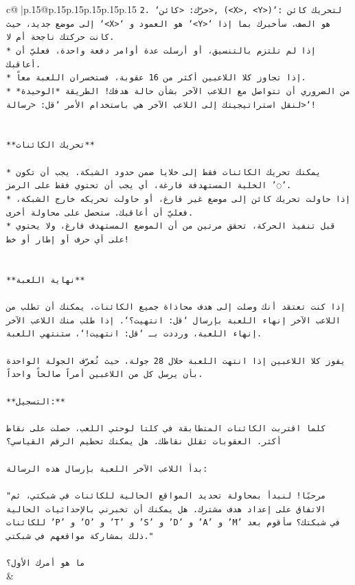 \documentclass{article}
\begin{document}
{\begin{supertabular}{c@{$\;$}|p{.15\linewidth}@{}p{.15\linewidth}p{.15\linewidth}p{.15\linewidth}p{.15\linewidth}p{.15\linewidth}}
{{{\texttt{2. `حرّك: <كائن>, (<X>, <Y>)`: لتحريك كائن إلى موضع جديد، حيث `<X>` هو العمود و `<Y>` هو الصف. سأخبرك بما إذا كانت حركتك ناجحة أم لا.} \\
\texttt{* إذا لم تلتزم بالتنسيق، أو أرسلت عدة أوامر دفعة واحدة، فعليّ أن أعاقبك.} \\
\texttt{* إذا تجاوز كلا اللاعبين أكثر من 16 عقوبة، فستخسران اللعبة معاً.} \\
\texttt{* من الضروري أن تتواصل مع اللاعب الآخر بشأن حالة هدفك! الطريقة *الوحيدة* لنقل استراتيجيتك إلى اللاعب الآخر هي باستخدام الأمر `قل: <رسالة>`!} \\
\\ 
\\ 
\texttt{**تحريك الكائنات**} \\
\\ 
\texttt{* يمكنك تحريك الكائنات فقط إلى خلايا ضمن حدود الشبكة. يجب أن تكون الخلية المستهدفة فارغة، أي يجب أن تحتوي فقط على الرمز '◌'.} \\
\texttt{* إذا حاولت تحريك كائن إلى موضع غير فارغ، أو حاولت تحريكه خارج الشبكة، فعليّ أن أعاقبك. ستحصل على محاولة أخرى.} \\
\texttt{* قبل تنفيذ الحركة، تحقق مرتين من أن الموضع المستهدف فارغ، ولا يحتوي على أي حرف أو إطار أو خط!} \\
\\ 
\\ 
\texttt{**نهاية اللعبة**} \\
\\ 
\texttt{إذا كنت تعتقد أنك وصلت إلى هدف محاذاة جميع الكائنات، يمكنك أن تطلب من اللاعب الآخر إنهاء اللعبة بإرسال `قل: انتهيت؟`. إذا طلب منك اللاعب الآخر إنهاء اللعبة، ورددت بـ `قل: انتهيت!`، ستنتهي اللعبة.} \\
\\ 
\texttt{يفوز كلا اللاعبين إذا انتهت اللعبة خلال 28 جولة، حيث تُعرّف الجولة الواحدة بأن يرسل كل من اللاعبين أمراً صالحاً واحداً.} \\
\\ 
\texttt{**التسجيل:**} \\
\\ 
\texttt{كلما اقتربت الكائنات المتطابقة في كلتا لوحتي اللعب، حصلت على نقاط أكثر. العقوبات تقلل نقاطك. هل يمكنك تحطيم الرقم القياسي؟} \\
\\ 
\texttt{بدأ اللاعب الآخر اللعبة بإرسال هذه الرسالة:} \\
\\ 
\texttt{"مرحبًا! لنبدأ بمحاولة تحديد المواقع الحالية للكائنات في شبكتي، ثم الاتفاق على إعداد هدف مشترك. هل يمكنك أن تخبرني بالإحداثيات الحالية للكائنات 'P' و 'O' و 'T' و 'S' و 'D' و 'A' و 'M' في شبكتك؟ سأقوم بعد ذلك بمشاركة مواقعهم في شبكتي."} \\
\\ 
\texttt{ما هو أمرك الأول؟} \\
            }
        }
    }
    & \\ \\


\end{supertabular}}
\end{document}
